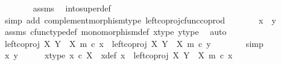 \begin{isabellebody}
\ \ \ \ \ \ \isamarkupfalse%
\ assms\ \isamarkupfalse%
\ into{\isacharunderscore}{\kern0pt}super{\isacharunderscore}{\kern0pt}def\isanewline
\ \ \ \ \ \ \isamarkupfalse%
\ {\isacharparenleft}{\kern0pt}simp\ add{\isacharcolon}{\kern0pt}\ complement{\isacharunderscore}{\kern0pt}morphism{\isacharunderscore}{\kern0pt}type\ left{\isacharunderscore}{\kern0pt}coproj{\isacharunderscore}{\kern0pt}cfunc{\isacharunderscore}{\kern0pt}coprod{\isacharparenright}{\kern0pt}\isanewline
\ \ \ \ \isamarkupfalse%
\ \isamarkupfalse%
\ {\isachardoublequoteopen}x{\isacharprime}{\kern0pt}\ {\isacharequal}{\kern0pt}\ y{\isacharprime}{\kern0pt}{\isachardoublequoteclose}\isanewline
\ \ \ \ \ \ \isamarkupfalse%
\ assms\ cfunc{\isacharunderscore}{\kern0pt}type{\isacharunderscore}{\kern0pt}def\ monomorphism{\isacharunderscore}{\kern0pt}def\ x{\isacharprime}{\kern0pt}{\isacharunderscore}{\kern0pt}type\ y{\isacharprime}{\kern0pt}{\isacharunderscore}{\kern0pt}type\ \isamarkupfalse%
\ auto\isanewline
\ \ \ \ \isamarkupfalse%
\ \isamarkupfalse%
\ {\isachardoublequoteopen}left{\isacharunderscore}{\kern0pt}coproj\ X\ {\isacharparenleft}{\kern0pt}Y\ {\isasymsetminus}\ {\isacharparenleft}{\kern0pt}X{\isacharcomma}{\kern0pt}\ m{\isacharparenright}{\kern0pt}{\isacharparenright}{\kern0pt}\ {\isasymcirc}\isactrlsub c\ x{\isacharprime}{\kern0pt}\ {\isacharequal}{\kern0pt}\ left{\isacharunderscore}{\kern0pt}coproj\ X\ {\isacharparenleft}{\kern0pt}Y\ {\isasymsetminus}\ {\isacharparenleft}{\kern0pt}X{\isacharcomma}{\kern0pt}\ m{\isacharparenright}{\kern0pt}{\isacharparenright}{\kern0pt}\ {\isasymcirc}\isactrlsub c\ y{\isacharprime}{\kern0pt}{\isachardoublequoteclose}\isanewline
\ \ \ \ \ \ \isamarkupfalse%
\ simp\isanewline
\ \ \isamarkupfalse%
\isanewline
\ \ \ \ \isamarkupfalse%
\ x{\isacharprime}{\kern0pt}\ y{\isacharprime}{\kern0pt}\isanewline
\ \ \ \ \isamarkupfalse%
\ x{\isacharprime}{\kern0pt}{\isacharunderscore}{\kern0pt}type{\isacharcolon}{\kern0pt}\ {\isachardoublequoteopen}x{\isacharprime}{\kern0pt}\ {\isasymin}\isactrlsub c\ X{\isachardoublequoteclose}\ \ x{\isacharunderscore}{\kern0pt}def{\isacharcolon}{\kern0pt}\ {\isachardoublequoteopen}x\ {\isacharequal}{\kern0pt}\ left{\isacharunderscore}{\kern0pt}coproj\ X\ {\isacharparenleft}{\kern0pt}Y\ {\isasymsetminus}\ {\isacharparenleft}{\kern0pt}X{\isacharcomma}{\kern0pt}\ m{\isacharparenright}{\kern0pt}{\isacharparenright}{\kern0pt}\ {\isasymcirc}\isactrlsub c\ x{\isacharprime}{\kern0pt}{\isachardoublequoteclose}\isanewline

\end{isabellebody}
